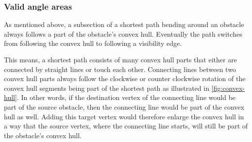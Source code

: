 			\subsubsection{Valid angle areas}
				
				As mentioned above, a subsection of a shortest path bending around an obstacle always follows a part of the obstacle's convex hull.
				Eventually the path switches from following the convex hull to following a visibility edge.
				
				This means, a shortest path consists of many convex hull parts that either are connected by straight lines or touch each other.
				Connecting lines between two convex hull parts always follow the clockwise or counter clockwise rotation of the convex hull segments being part of the shortest path as illustrated in \cref{fig:convex-hull}.
				In other words, if the destination vertex of the connecting line would be part of the source obstacle, then the connecting line would be part of the convex hull as well.
				Adding this target vertex would therefore enlarge the convex hull in a way that the source vertex, where the connecting line starts, will still be part of the obstacle's convex hull.

